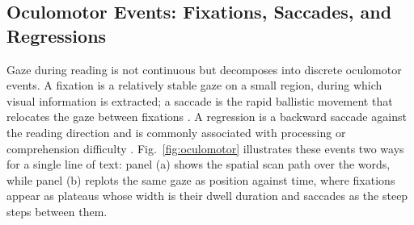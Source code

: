 \subsection{Oculomotor Events: Fixations, Saccades, and Regressions}
\label{subsec:oculomotor-events}
Gaze during reading is not continuous but decomposes into discrete oculomotor events.
A fixation is a relatively stable gaze on a small region, during which visual information is extracted; a saccade is the rapid ballistic movement that relocates the gaze between fixations \cite{salvucci2000identifying}.
A regression is a backward saccade against the reading direction and is commonly associated with processing or comprehension difficulty \cite{guan2022predictive}.
Fig.~\ref{fig:oculomotor} illustrates these events two ways for a single line of text: panel (a) shows the spatial scan path over the words, while panel (b) replots the same gaze as position against time, where fixations appear as plateaus whose width is their dwell duration and saccades as the steep steps between them.

